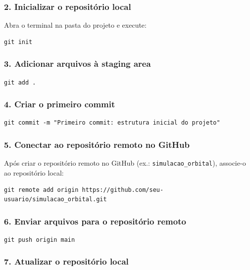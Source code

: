 \subsubsection*{2. Inicializar o repositório local}

Abra o terminal na pasta do projeto e execute:

\begin{lstlisting}[style=shellstyle]
git init
\end{lstlisting}

\subsubsection*{3. Adicionar arquivos à staging area}

\begin{lstlisting}[style=shellstyle]
git add .
\end{lstlisting}

\subsubsection*{4. Criar o primeiro commit}

\begin{lstlisting}[style=shellstyle]
git commit -m "Primeiro commit: estrutura inicial do projeto"
\end{lstlisting}

\subsubsection*{5. Conectar ao repositório remoto no GitHub}

Após criar o repositório remoto no GitHub (ex.: \texttt{simulacao\_orbital}), associe-o ao repositório local:

\begin{lstlisting}[style=shellstyle]
git remote add origin https://github.com/seu-usuario/simulacao_orbital.git
\end{lstlisting}

\subsubsection*{6. Enviar arquivos para o repositório remoto}

\begin{lstlisting}[style=shellstyle]
git push origin main
\end{lstlisting}

\subsubsection*{7. Atualizar o repositório local}


